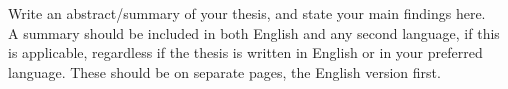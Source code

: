 
Write an abstract/summary of your thesis, and state your main findings here. \\

\noindent A summary should be included in both English and any second language, if this is applicable, regardless if the thesis is written in English or in your preferred language. These should be on separate pages, the English version first.







